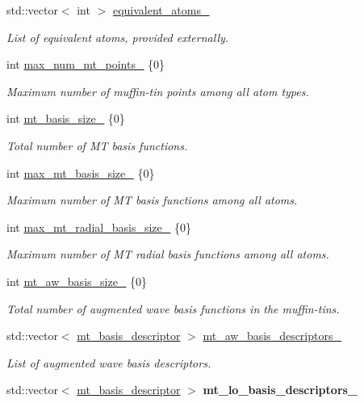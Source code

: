 \begin{DoxyCompactItemize}
std\+::vector$<$ int $>$ \hyperlink{classsirius_1_1_unit__cell_a2c9eea8e1e25c25a75851e8cdafff370}{equivalent\+\_\+atoms\+\_\+}
\begin{DoxyCompactList}\small\item\em List of equivalent atoms, provided externally. \end{DoxyCompactList}\item 
int \hyperlink{classsirius_1_1_unit__cell_af8042706572062065441da33fa8cc575}{max\+\_\+num\+\_\+mt\+\_\+points\+\_\+} \{0\}
\begin{DoxyCompactList}\small\item\em Maximum number of muffin-\/tin points among all atom types. \end{DoxyCompactList}\item 
int \hyperlink{classsirius_1_1_unit__cell_a2e7703e76b4f7e69f58d1678d1f94a01}{mt\+\_\+basis\+\_\+size\+\_\+} \{0\}
\begin{DoxyCompactList}\small\item\em Total number of M\+T basis functions. \end{DoxyCompactList}\item 
int \hyperlink{classsirius_1_1_unit__cell_ac57f42d865230924812b53f425f627b8}{max\+\_\+mt\+\_\+basis\+\_\+size\+\_\+} \{0\}
\begin{DoxyCompactList}\small\item\em Maximum number of M\+T basis functions among all atoms. \end{DoxyCompactList}\item 
int \hyperlink{classsirius_1_1_unit__cell_aeb3c8a1990a2121ffc9feabf9793d1f0}{max\+\_\+mt\+\_\+radial\+\_\+basis\+\_\+size\+\_\+} \{0\}
\begin{DoxyCompactList}\small\item\em Maximum number of M\+T radial basis functions among all atoms. \end{DoxyCompactList}\item 
int \hyperlink{classsirius_1_1_unit__cell_a5b4e200542b2d648832108478296d9f3}{mt\+\_\+aw\+\_\+basis\+\_\+size\+\_\+} \{0\}
\begin{DoxyCompactList}\small\item\em Total number of augmented wave basis functions in the muffin-\/tins. \end{DoxyCompactList}\item 
std\+::vector$<$ \hyperlink{structmt__basis__descriptor}{mt\+\_\+basis\+\_\+descriptor} $>$ \hyperlink{classsirius_1_1_unit__cell_af2ca4393c20299bf86b38d7a23c1fcab}{mt\+\_\+aw\+\_\+basis\+\_\+descriptors\+\_\+}
\begin{DoxyCompactList}\small\item\em List of augmented wave basis descriptors. \end{DoxyCompactList}\item 
\hypertarget{classsirius_1_1_unit__cell_a412e3813abb2216b0c061c23f3d42488}{}std\+::vector$<$ \hyperlink{structmt__basis__descriptor}{mt\+\_\+basis\+\_\+descriptor} $>$ {\bfseries mt\+\_\+lo\+\_\+basis\+\_\+descriptors\+\_\+}\label{classsirius_1_1_unit__cell_a412e3813abb2216b0c061c23f3d42488}


\end{DoxyCompactItemize}
